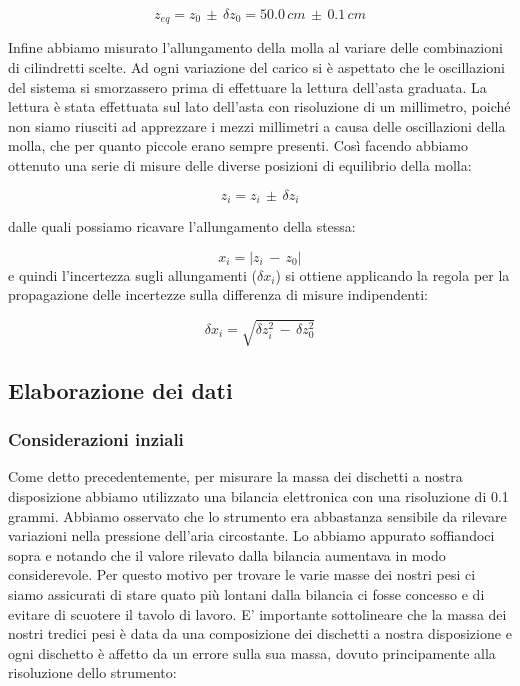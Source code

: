 \begin{equation*}
	z_{eq} = z_0\,\pm\,\delta z_0 = 50.0\,cm\,\pm\,0.1\,cm
\end{equation*}

Infine abbiamo misurato l'allungamento della molla al variare delle combinazioni di cilindretti scelte. Ad ogni variazione del carico si è aspettato che le oscillazioni del sistema si smorzassero prima di effettuare la lettura dell'asta graduata. La lettura è stata effettuata sul lato dell'asta con risoluzione di un millimetro, poiché non siamo riusciti ad apprezzare i mezzi millimetri a causa delle oscillazioni della molla, che per quanto piccole erano sempre presenti. Così facendo abbiamo ottenuto una serie di misure delle diverse posizioni di equilibrio della molla:

\begin{equation*}
	z_i = z_i\,\pm\,\delta z_i 
\end{equation*}

dalle quali possiamo ricavare l'allungamento della stessa:

\begin{equation*}
	x_i = |z_i\,-\,z_0|
\end{equation*}
e quindi l’incertezza sugli allungamenti ($\delta x_i$) si ottiene applicando la regola per la propagazione delle incertezze sulla differenza di misure indipendenti:

\begin{equation*}
	\delta x_i = \sqrt{\delta z_i^2\,-\,\delta z_0^2}
\end{equation*}

\subsection{Elaborazione dei dati}

\subsubsection{Considerazioni inziali}
Come detto precedentemente, per misurare la massa dei dischetti a nostra disposizione abbiamo utilizzato una bilancia elettronica con una risoluzione di 0.1 grammi. Abbiamo osservato che lo strumento era abbastanza sensibile da rilevare variazioni nella pressione dell'aria circostante. Lo abbiamo appurato soffiandoci sopra e notando che il valore rilevato dalla bilancia aumentava in modo considerevole. Per questo motivo per trovare le varie masse dei nostri pesi ci siamo assicurati di stare quato più lontani dalla bilancia ci fosse concesso e di evitare di scuotere il tavolo di lavoro.
E' importante sottolineare che la massa dei nostri tredici pesi è data da una composizione dei dischetti a nostra disposizione e ogni dischetto è affetto da un errore sulla sua massa, dovuto principamente alla risoluzione dello strumento:

